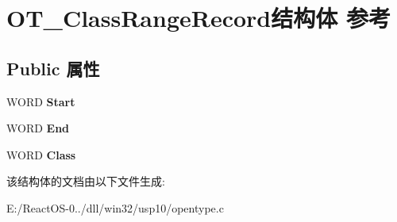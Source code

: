 \hypertarget{struct_o_t___class_range_record}{}\section{O\+T\+\_\+\+Class\+Range\+Record结构体 参考}
\label{struct_o_t___class_range_record}
\subsection*{Public 属性}
\begin{DoxyCompactItemize}
\item 
\mbox{\label{struct_o_t___class_range_record_ae558d24fa278ba5d418382aa2aa8127b}} 
W\+O\+RD {\bfseries Start}
\item 
\mbox{\label{struct_o_t___class_range_record_a566e91e39931fb048b306ba6675747d7}} 
W\+O\+RD {\bfseries End}
\item 
\mbox{\label{struct_o_t___class_range_record_a8b7fd3890d612abe9680a1e7aabb03f5}} 
W\+O\+RD {\bfseries Class}
\end{DoxyCompactItemize}


该结构体的文档由以下文件生成\+:\begin{DoxyCompactItemize}
\item 
E\+:/\+React\+O\+S-\/0../dll/win32/usp10/opentype.\+c\end{DoxyCompactItemize}
